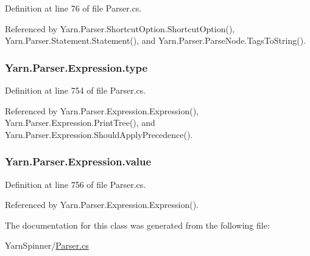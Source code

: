 Definition at line 76 of file Parser.\-cs.



Referenced by Yarn.\-Parser.\-Shortcut\-Option.\-Shortcut\-Option(), Yarn.\-Parser.\-Statement.\-Statement(), and Yarn.\-Parser.\-Parse\-Node.\-Tags\-To\-String().

\hypertarget{a00098_ad55c92df835006328bc2a79a8f91efb9}{
\subsubsection[{type}]{ Yarn.\-Parser.\-Expression.\-type\hspace{0.3cm}{\ttfamily [package]}}}\label{a00098_ad55c92df835006328bc2a79a8f91efb9}


Definition at line 754 of file Parser.\-cs.



Referenced by Yarn.\-Parser.\-Expression.\-Expression(), Yarn.\-Parser.\-Expression.\-Print\-Tree(), and Yarn.\-Parser.\-Expression.\-Should\-Apply\-Precedence().

\hypertarget{a00098_a569e516782891544c334ff8131b23108}{
\subsubsection[{value}]{ Yarn.\-Parser.\-Expression.\-value\hspace{0.3cm}{\ttfamily [package]}}}\label{a00098_a569e516782891544c334ff8131b23108}


Definition at line 756 of file Parser.\-cs.



Referenced by Yarn.\-Parser.\-Expression.\-Expression().



The documentation for this class was generated from the following file\-:\begin{DoxyCompactItemize}
\item 
Yarn\-Spinner/\hyperlink{a00301}{Parser.\-cs}\end{DoxyCompactItemize}
